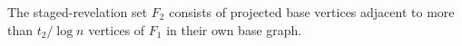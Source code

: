 \begin{definition}
The staged-revelation set \(F_2\) consists of projected base vertices adjacent
to more than \(t_2/\log n\) vertices of \(F_1\) in their own base graph.
\end{definition}
